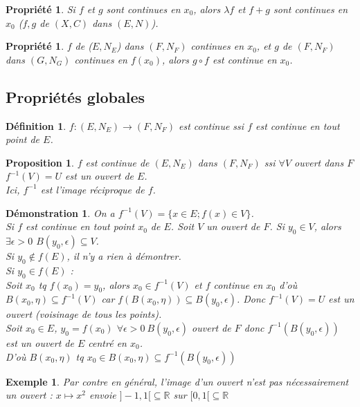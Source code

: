 \documentclass[a4paper, oneside]{report}
\theoremstyle{break}
\newtheorem{defi}[thm]{Définition}
\newtheorem{propr}[thm]{Propriété}
\newtheorem{propo}[thm]{Proposition}
\newtheorem{exem}[thm]{Exemple}
\newtheorem*{demo}{Démonstration}
\newcommand{\R}{\mathbb{R}}
\begin{document}
\begin{propr}
Si $f$ et $g$ sont continues en $x_0$, alors $\lambda f$ et $f+g$ sont continues en $x_0$ ($f,g$ de $(X,C)$ dans $(E,N)$).
\end{propr}


\begin{propr}
$f$ de ($E,N_E$) dans $(F,N_F)$ continues en $x_0$, et $g$ de $(F,N_F)$ dans $(G,N_G)$ continues en $f(x_0)$, alors $g\circ f$ est continue en $x_0$.
\end{propr} 


\subsection{Propriétés globales}

\begin{defi}
$f:(E,N_E)\rightarrow (F,N_F)$ est continue ssi $f$ est continue en tout point de $E$.
\end{defi}
\begin{propo}
$f$ est continue de $(E,N_E)$ dans $(F,N_F)$ ssi $\forall V$ ouvert dans $F$ $f^{-1}(V)=U$ est un ouvert de $E$.\\
Ici, $f^{-1}$ est l'image réciproque de $f$.
\end{propo}


\begin{demo}
On a $f^{-1}(V)=\{x\in E; f(x)\in V \}$.\\

Si $f$ est continue en tout point $x_0$ de $E$. Soit $V$ un ouvert de $F$. Si $y_0 \in V$, alors $\exists \epsilon >0$ $B(y_0,\epsilon)\subseteq V$.\\
Si $y_0 \notin f(E)$, il n'y a rien à démontrer.\\
Si $y_0\in f(E)$ :\\
Soit $x_0$ tq $f(x_0)=y_0$, alors $x_0\in f^{-1}(V)$ et $f$ continue en $x_0$ d'où $B(x_0,\eta) \subseteq f^{-1}(V)$ car $f(B(x_0,\eta))\subseteq B(y_0,\epsilon)$. Donc $f^{-1}(V)=U$ est un ouvert (voisinage de tous les points).\\

Soit $x_0\in E$, $y_0=f(x_0)$ $\forall \epsilon >0~B(y_0,\epsilon)$ ouvert de $F$ donc $f^{-1}(B(y_0,\epsilon))$ est un ouvert de $E$ centré en $x_0$.\\
D'où $B(x_0,\eta)$ tq $x_0 \in B(x_0,\eta)\subseteq f^{-1}(B(y_0,\epsilon))$
\end{demo}


\begin{exem}

Par contre en général, l'image d'un ouvert n'est pas nécessairement un ouvert :
$x\mapsto x^2$ envoie $]-1,1[\subseteq\R$ sur $[0,1[\subseteq \R$
\end{exem}
\end{document}
